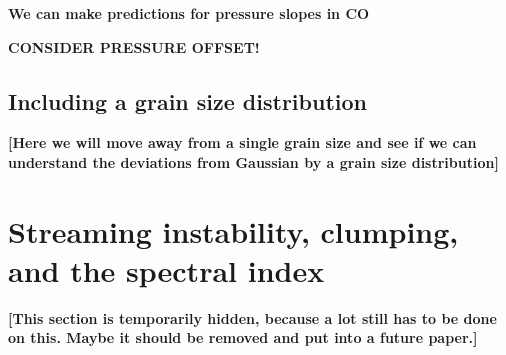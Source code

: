 \documentclass{aa}
\begin{document}
{\bf We can make predictions for pressure slopes in CO}


{\bf CONSIDER PRESSURE OFFSET!}


\subsection{Including a grain size distribution}
%
\label{sec-model-with-grain-size-distribution}

{\bf [Here we will move away from a single grain size and see if we can understand
the deviations from Gaussian by a grain size distribution]}



\section{Streaming instability, clumping, and the spectral index}
\label{sec-si-clump}
%

{\bf [This section is temporarily hidden, because a lot still has to be
done on this. Maybe it should be removed and put into a future paper.]}
\end{document}
